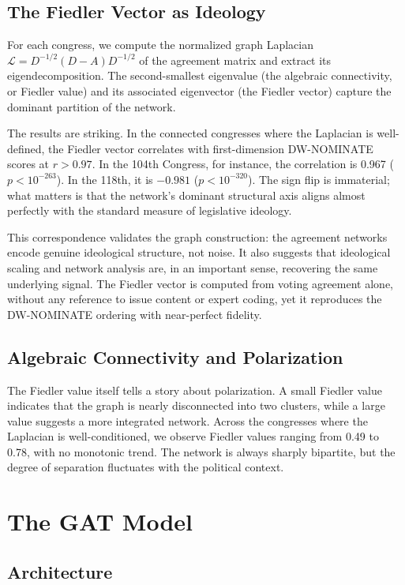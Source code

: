 \documentclass[11pt]{article}
\begin{document}
\subsection{The Fiedler Vector as Ideology}

For each congress, we compute the normalized graph Laplacian $\mathcal{L} = D^{-1/2}(D - A)D^{-1/2}$ of the agreement matrix and extract its eigendecomposition. The second-smallest eigenvalue (the algebraic connectivity, or Fiedler value) and its associated eigenvector (the Fiedler vector) capture the dominant partition of the network.

The results are striking. In the connected congresses where the Laplacian is well-defined, the Fiedler vector correlates with first-dimension DW-NOMINATE scores at $r > 0.97$. In the 104th Congress, for instance, the correlation is 0.967 ($p < 10^{-263}$). In the 118th, it is $-0.981$ ($p < 10^{-320}$). The sign flip is immaterial; what matters is that the network's dominant structural axis aligns almost perfectly with the standard measure of legislative ideology.

This correspondence validates the graph construction: the agreement networks encode genuine ideological structure, not noise. It also suggests that ideological scaling and network analysis are, in an important sense, recovering the same underlying signal. The Fiedler vector is computed from voting agreement alone, without any reference to issue content or expert coding, yet it reproduces the DW-NOMINATE ordering with near-perfect fidelity.

\subsection{Algebraic Connectivity and Polarization}

The Fiedler value itself tells a story about polarization. A small Fiedler value indicates that the graph is nearly disconnected into two clusters, while a large value suggests a more integrated network. Across the congresses where the Laplacian is well-conditioned, we observe Fiedler values ranging from 0.49 to 0.78, with no monotonic trend. The network is always sharply bipartite, but the degree of separation fluctuates with the political context.

\section{The GAT Model}

\subsection{Architecture}
\end{document}
